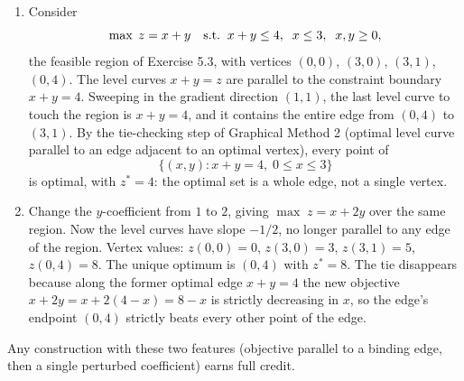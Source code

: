 \begin{enumerate}
\item Consider
\[
\max\; z = x + y \quad \text{s.t.}\;\; x + y \leq 4, \;\; x \leq 3, \;\; x, y \geq 0,
\]
the feasible region of Exercise 5.3, with vertices $(0,0)$, $(3,0)$, $(3,1)$, $(0,4)$. The level curves $x + y = z$ are parallel to the constraint boundary $x + y = 4$. Sweeping in the gradient direction $(1,1)$, the last level curve to touch the region is $x + y = 4$, and it contains the entire edge from $(0,4)$ to $(3,1)$. By the tie-checking step of Graphical Method 2 (optimal level curve parallel to an edge adjacent to an optimal vertex), every point of
\[
\{ (x, y) : x + y = 4,\; 0 \leq x \leq 3 \}
\]
is optimal, with $z^* = 4$: the optimal set is a whole edge, not a single vertex.
\item Change the $y$-coefficient from $1$ to $2$, giving $\max\; z = x + 2y$ over the same region. Now the level curves have slope $-1/2$, no longer parallel to any edge of the region. Vertex values: $z(0,0)=0$, $z(3,0)=3$, $z(3,1)=5$, $z(0,4)=8$. The unique optimum is $(0,4)$ with $z^* = 8$. The tie disappears because along the former optimal edge $x + y = 4$ the new objective $x + 2y = x + 2(4 - x) = 8 - x$ is strictly decreasing in $x$, so the edge's endpoint $(0,4)$ strictly beats every other point of the edge.
\end{enumerate}
Any construction with these two features (objective parallel to a binding edge, then a single perturbed coefficient) earns full credit.
